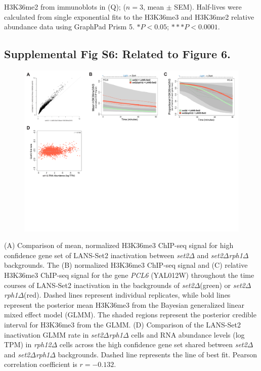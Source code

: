\documentclass[11pt]{biorxiv}
\newcommand{\setdelt}{\emph{set2$\Delta$}\xspace}
\newcommand{\rphdelt}{\emph{rph12$\Delta$}\xspace}
\newcommand{\setdeltrphdelt}{\emph{set2$\Delta$rph1$\Delta$}\xspace}
\begin{document}
H3K36me2 from immunoblots in (Q); ($n = 3$, mean $\pm$ SEM). Half-lives were calculated from single exponential fits to the H3K36me3 and H3K36me2 relative abundance data using GraphPad Prism 5. $*P < 0.05$; $***P < 0.0001$. 

\clearpage

\subsection{Supplemental Fig S6: Related to Figure 6.}
\begin{figure}[ht!]
\center
\includegraphics[width=\textwidth, trim={0in 0in 0in 0in}, clip]{figures/Supplemental_Fig_S6_compressed.pdf}
\end{figure}
\vspace*{-1.5in}
\noindent (A) Comparison of mean, normalized H3K36me3 ChIP-seq signal for high confidence gene set of LANS-Set2 inactivation between \setdelt and \setdeltrphdelt backgrounds. The (B) normalized H3K36me3 ChIP-seq signal and (C) relative H3K36me3 ChIP-seq signal for the gene \emph{PCL6} (YAL012W) throughout the time courses of LANS-Set2 inactivation in the backgrounds of \setdelt (green) or \setdeltrphdelt (red). Dashed lines represent individual replicates, while bold lines represent the posterior mean H3K36me3 from the Bayesian generalized linear mixed effect model (GLMM). The shaded regions represent the posterior credible interval for H3K36me3 from the GLMM. (D) Comparison of the LANS-Set2 inactivation GLMM rate in \setdeltrphdelt cells and RNA abundance levels (log TPM) in \rphdelt cells across the high confidence gene set shared between \setdelt and \setdeltrphdelt backgrounds. Dashed line represents the line of best fit. Pearson correlation coefficient is $r=-0.132$. 
\end{document}
